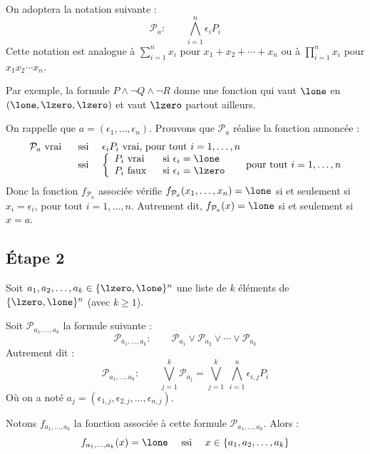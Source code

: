 \documentclass[11pt,class=report,crop=false]{standalone}
\begin{document}
On adoptera la notation suivante :
\[
\mathcal{P}_a : \qquad
\bigwedge_{i=1}^n \epsilon_i P_i
\]
Cette notation est analogue à $\displaystyle \sum_{i=1}^n x_i$ pour $x_1+x_2+\cdots+x_n$ ou à $\displaystyle \prod_{i=1}^n x_i$ pour $x_1x_2\cdots x_n$.

Par exemple, la formule $P \land \lnot Q \land \lnot R$ donne une fonction qui vaut $\lone$ en $(\lone,\lzero,\lzero)$ et vaut $\lzero$ partout ailleurs.


On rappelle que $a = (\epsilon_1,\ldots,\epsilon_n)$.
Prouvons que $\mathcal{P}_a$ réalise la fonction annoncée :
\[
\begin{array}{rcl}
\mathcal{P}_a \text{ vrai } 
	& \text{ ssi } & \epsilon_i P_i \text{ vrai, pour tout } i=1,\ldots,n \\
	& \text{ ssi } & 
	\left\{ 
	\begin{array}{ll}
	P_i \text{ vrai } & \text{ si } \epsilon_i = \lone \\
	P_i \text{ faux } & \text{ si } \epsilon_i = \lzero \\	
	\end{array}	
	\right.
	\quad \text{  pour tout } i=1,\ldots,n \\
\end{array}
\]
Donc la fonction $f_{\mathcal{P}_a}$ associée vérifie $f_{\mathcal{P}_a}(x_1,\ldots,x_n)=\lone$ si et seulement si $x_i=\epsilon_i$, pour tout $i=1,\ldots,n$.
Autrement dit, $f_{\mathcal{P}_a}(x) = \lone$ si et seulement si $x=a$.

\subsection{Étape 2}

Soit $a_1,a_2,\ldots,a_k \in \{\lzero,\lone\}^n$ une liste de $k$ éléments de $\{\lzero,\lone\}^n$ (avec $k\ge1$).

Soit $\mathcal{P}_{a_1,\ldots,a_k}$ la formule suivante :
\[
\mathcal{P}_{a_1,\ldots,a_k} : \qquad
\mathcal{P}_{a_1} \lor \mathcal{P}_{a_2} \lor \cdots \lor \mathcal{P}_{a_k}
\]
Autrement dit :
\[
\mathcal{P}_{a_1,\ldots,a_k} : \qquad
\bigvee_{j=1}^k \mathcal{P}_{a_j}
= \bigvee_{j=1}^k \ \bigwedge_{i=1}^n \epsilon_{i,j} P_i
\]
Où on a noté $a_j = (\epsilon_{1,j},\epsilon_{2,j},\ldots,\epsilon_{n,j})$.

Notons $f_{a_1,\ldots,a_k}$ la fonction associée à cette formule $\mathcal{P}_{a_1,\ldots,a_k}$.
Alors :
\[
f_{a_1,\ldots,a_k}(x) =\lone \quad \text{ ssi } \quad x \in \{ a_1,a_2,\ldots,a_k \}
\]
\end{document}
